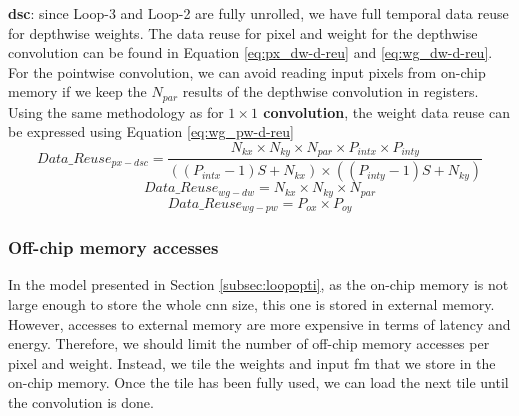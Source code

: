 \textbf{\acrshort{dsc}}: since Loop-3 and Loop-2 are fully unrolled, we have full temporal data reuse for depthwise weights. The data reuse for pixel and weight for the depthwise convolution can be found in Equation \eqref{eq:px_dw-d-reu} \cite{ma_optimizing_2018} and \eqref{eq:wg_dw-d-reu}. For the pointwise convolution, we can avoid reading input pixels from on-chip memory if we keep the $N_{par}$ results of the depthwise convolution in registers.
Using the same methodology as for \textbf{$1 \times 1$ convolution}, the weight data reuse can be expressed using Equation \eqref{eq:wg_pw-d-reu}
%
\begin{equation}
    Data\_Reuse_{px - dsc} = \frac{N_{kx} \times N_{ky} \times N_{par} \times P_{intx} \times P_{inty}}{\left( \left( P_{intx} - 1 \right)S + N_{kx} \right) \times \left( \left( P_{inty} - 1 \right)S + N_{ky} \right)}
    \label{eq:px_dw-d-reu}
\end{equation}
\begin{equation}
    Data\_Reuse_{wg-dw} = N_{kx} \times N_{ky} \times N_{par}
    \label{eq:wg_dw-d-reu}
\end{equation}
\begin{equation}
    Data\_Reuse_{wg-pw} = P_{ox} \times P_{oy}
    \label{eq:wg_pw-d-reu}
\end{equation}
%
\subsubsection{Off-chip memory accesses}
%
In the model presented in Section \ref{subsec:loopopti}, as the on-chip memory is not large enough to store the whole \acrshort{cnn} size, this one is stored in external memory. However, accesses to external memory are more expensive in terms of latency and energy. Therefore, we should limit the number of off-chip memory accesses per pixel and weight. Instead, we tile the weights and input \acrshort{fm} that we store in the on-chip memory. Once the tile has been fully used, we can load the next tile until the convolution is done.

